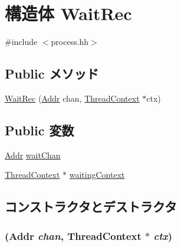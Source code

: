\hypertarget{structProcess_1_1WaitRec}{
\section{構造体 WaitRec}
\label{structProcess_1_1WaitRec}
}


{\ttfamily \#include $<$process.hh$>$}\subsection*{Public メソッド}
\begin{DoxyCompactItemize}
\item 
\hyperlink{structProcess_1_1WaitRec_a7ae7b76bb836e9d49888822586b0c8e6}{WaitRec} (\hyperlink{base_2types_8hh_af1bb03d6a4ee096394a6749f0a169232}{Addr} chan, \hyperlink{classThreadContext}{ThreadContext} $\ast$ctx)
\end{DoxyCompactItemize}
\subsection*{Public 変数}
\begin{DoxyCompactItemize}
\item 
\hyperlink{base_2types_8hh_af1bb03d6a4ee096394a6749f0a169232}{Addr} \hyperlink{structProcess_1_1WaitRec_a4e0bff73adcc46aa65c3e7f45803df17}{waitChan}
\item 
\hyperlink{classThreadContext}{ThreadContext} $\ast$ \hyperlink{structProcess_1_1WaitRec_af05343af1b3beaa38b21020a12e74a03}{waitingContext}
\end{DoxyCompactItemize}


\subsection{コンストラクタとデストラクタ}
\hypertarget{structProcess_1_1WaitRec_a7ae7b76bb836e9d49888822586b0c8e6}{
\subsubsection[{WaitRec}]{ ({\bf Addr} {\em chan}, \/  {\bf ThreadContext} $\ast$ {\em ctx})}}
\label{structProcess_1_1WaitRec_a7ae7b76bb836e9d49888822586b0c8e6}



